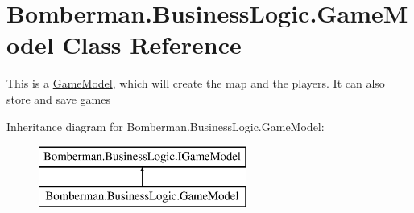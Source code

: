 \hypertarget{class_bomberman_1_1_business_logic_1_1_game_model}{}\section{Bomberman.\+Business\+Logic.\+Game\+Model Class Reference}
\label{class_bomberman_1_1_business_logic_1_1_game_model}


This is a \mbox{\hyperlink{class_bomberman_1_1_business_logic_1_1_game_model}{Game\+Model}}, which will create the map and the players. It can also store and save games  


Inheritance diagram for Bomberman.\+Business\+Logic.\+Game\+Model\+:\begin{figure}[H]
\begin{center}
\leavevmode
\includegraphics[height=2.000000cm]{class_bomberman_1_1_business_logic_1_1_game_model}
\end{center}
\end{figure}
